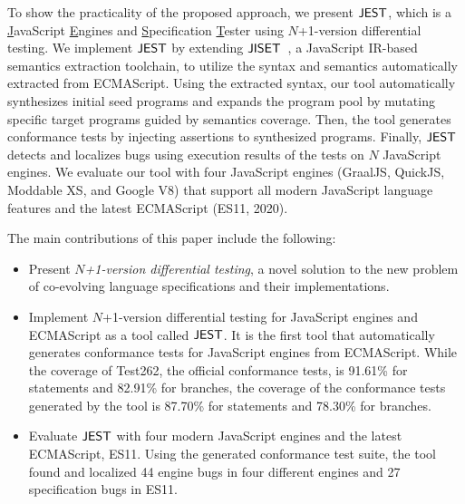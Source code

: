 To show the practicality of the proposed approach, we present $\tool$, which
is a \underline{J}avaScript \underline{E}ngines and
\underline{S}pecification \underline{T}ester using $N$+1-version differential testing.
We implement $\tool$ by extending $\jiset$~\cite{jiset}, a JavaScript
IR-based semantics extraction toolchain, to utilize the syntax and semantics
automatically extracted from ECMAScript.  Using the extracted syntax,
our tool automatically synthesizes initial seed programs and expands the program
pool by mutating specific target programs guided by semantics coverage.  Then,
the tool generates conformance tests by injecting assertions to synthesized
programs.  Finally, $\tool$ detects and localizes bugs using execution
results of the tests on $N$ JavaScript engines.  We evaluate our tool with four
JavaScript engines (GraalJS\cite{graaljs}, QuickJS\cite{qjs}, Moddable
XS\cite{xs}, and Google V8\cite{v8}) that support all modern JavaScript language
features and the latest ECMAScript (ES11, 2020).

The main contributions of this paper include the following:
\begin{itemize}
  \item Present \textit{$N$+1-version differential testing}, a novel solution to the new
    problem of co-evolving language specifications and their implementations.
  \item Implement $N$+1-version differential testing for JavaScript engines and
    ECMAScript as a tool called $\tool$. It is the first tool that automatically generates conformance
    tests for JavaScript engines from ECMAScript.  While the coverage
    of Test262, the official conformance tests, is 91.61\% for statements
    and 82.91\% for branches, the coverage of the conformance tests generated by the tool
    is 87.70\% for statements and 78.30\% for branches.
  \item Evaluate $\tool$ with four modern JavaScript engines and the latest
    ECMAScript, ES11.  Using the generated conformance test
    suite, the tool found and localized 44 engine bugs in four different
    engines and 27 specification bugs in ES11.
\end{itemize}

